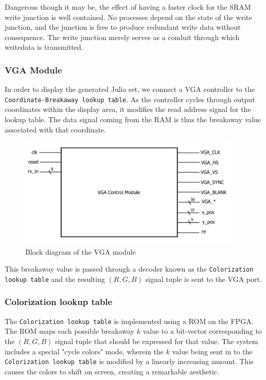 \documentclass{article}
\begin{document}
Dangerous though it may be, the effect of having a faster clock for the SRAM write junction is well contained.
No processes depend on the state of the write junction, and the junction is free to produce redundant write data
without consequence. The write junction merely serves as a conduit through which writedata is transmitted.


\subsubsection{VGA Module}

In order to display the generated Julia set, we connect a VGA controller 
 to the \texttt{Coordinate-Breakaway lookup table}. As the controller cycles
through output coordinates within the display area, it modifies the
read address signal for the lookup table. The data signal coming from
the RAM is thus the breakaway value associated with that coordinate.

\begin{figure}[H]
  \centering
    \includegraphics[width=300pt]{block_diagrams/vga.pdf}
  \caption{Block diagram of the VGA module}
\end{figure}

This breakaway value is passed through a decoder known as the
\texttt{Colorization lookup table} and the resulting $(R, G, B)$ signal tuple
is sent to the VGA port.

\subsubsection{Colorization lookup table}
The \texttt{Colorization lookup table} is implemented using a ROM on the FPGA. The ROM maps each possible breakaway $k$ value to a bit-vector corresponding to the $(R, G, B)$ signal tuple that should be expressed for that value.
The system includes a special "cycle colors" mode, wherein the $k$ value being sent in to the \texttt{Colorization 
lookup table} is modified by a linearly increasing amount. This causes the colors to shift on screen, creating a 
remarkable aesthetic.
\end{document}
